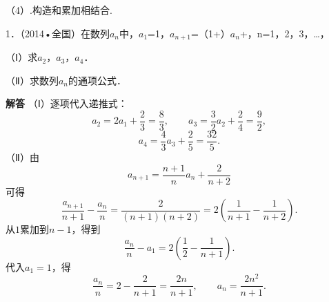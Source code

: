 （4）.构造和累加相结合.\par
{}
1．（2014•全国）在数列{\ensuremath{a_{n}}}中，\ensuremath{a_{1}}=1，\ensuremath{a_{n+1}}=（1+）\ensuremath{a_{n}}+，n=1，2，3，\ldots{}，\par
（Ⅰ）求\ensuremath{a_{2}}，\ensuremath{a_{3}}，\ensuremath{a_{4}}．\par
（Ⅱ）求数列{\ensuremath{a_{n}}}的通项公式．\par
\QuestionSpace{4.8cm}
\ifshowanswers
\par\begingroup\color{solutioncolor}\noindent\textbf{解答}\quad
（Ⅰ）逐项代入递推式：
\[
a_2=2a_1+\frac23=\frac83,\qquad
a_3=\frac32a_2+\frac24=\frac92,
\]
\[
a_4=\frac43a_3+\frac25=\frac{32}{5}.
\]
（Ⅱ）由
\[
a_{n+1}=\frac{n+1}{n}a_n+\frac2{n+2}
\]
可得
\[
\frac{a_{n+1}}{n+1}-\frac{a_n}{n}
=\frac{2}{(n+1)(n+2)}
=2\left(\frac1{n+1}-\frac1{n+2}\right).
\]
从$1$累加到$n-1$，得到
\[
\frac{a_n}{n}-a_1
=2\left(\frac12-\frac1{n+1}\right).
\]
代入$a_1=1$，得
\[
\frac{a_n}{n}=2-\frac2{n+1}=\frac{2n}{n+1},
\qquad
\boxed{a_n=\frac{2n^2}{n+1}}.
\]
\par\endgroup\fi

